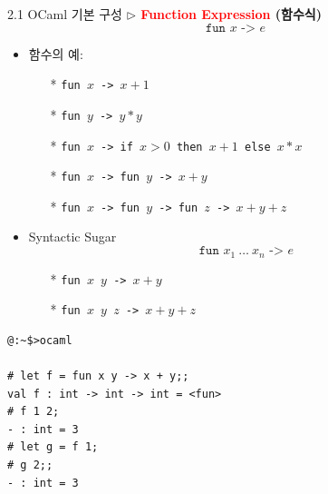 \documentclass[10pt]{beamer}
\begin{document}
	\begin{frame}{2.1 OCaml 기본 구성}
		\textbf{$\triangleright$ \textcolor{red}{Function Expression} (함수식)}
		\[
		\texttt{fun $x$ -> $e$}
		\] 
		\begin{itemize}
			\item 함수의 예:
			\begin{itemize}
				\item[*] \texttt{fun $x$ -> $x+1$}
				\item[*] \texttt{fun $y$ -> $y*y$}
				\item[*] \texttt{fun $x$ -> if $x>0$ then $x+1$ else $x*x$}
				\item[*] \texttt{fun $x$ -> fun $y$ -> $x+y$}
				\item[*] \texttt{fun $x$ -> fun $y$ -> fun $z$ -> $x+y+z$}
			\end{itemize}
			\item[]
			\item Syntactic Sugar \[
			\texttt{fun $x_1\ \dots\ x_n$\ ->\ $e$}
			\]
			\begin{itemize}
				\item[*] \texttt{fun $x$ $y$ -> $x+y$}
				\item[*] \texttt{fun $x$ $y$ $z$ -> $x+y+z$}
			\end{itemize}
		\end{itemize}
	\end{frame}
\begin{itemize}
	\item[]
	\item[]
	\item[]
\end{itemize}
\begin{lstlisting}[style=zsh]
@:~$>ocaml

# let f = fun x y -> x + y;;
val f : int -> int -> int = <fun>
# f 1 2;
- : int = 3
# let g = f 1;
# g 2;;
- : int = 3
\end{lstlisting}

\newpage
%
%	
%	
%	
\end{document}
